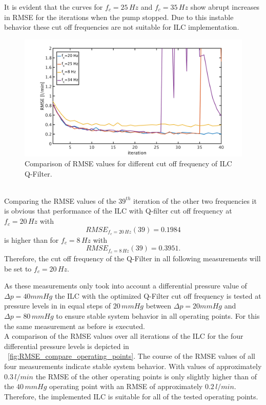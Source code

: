 It is evident that the curves for $f_c=25\,Hz$ and $f_c=35\,Hz$ show abrupt increases in RMSE for the iterations when the pump stopped. Due to this instable behavior these cut off frequencies are not suitable for ILC implementation.
\begin{figure}[ht]
  \centering
  \includegraphics[width=\textwidth]{images/chapt_5/ILC/RMSE_compare_ILC3_fc.pdf}
  \caption[Comparison of RMSE values for different cut off frequency of ILC Q-Filter]{Comparison of RMSE values for different cut off frequency of ILC Q-Filter.}
  \label{fig:RMSE_compare_ILC3_fc}
\end{figure}
\\Comparing the RMSE values of the $39^{th}$ iteration of the other two frequencies it is obvious that performance of the ILC with Q-filter cut off frequency at $f_c=20\,Hz$ with
\begin{equation}
  RMSE_{f_c=20\,Hz}(39)=0.1984
\end{equation}
is higher than for $f_c=8\,Hz$ with
\begin{equation}
  RMSE_{f_c=8\,Hz}(39)=0.3951.
\end{equation}
Therefore, the cut off frequency of the Q-Filter in all following measurements will be set to $f_c=20\,Hz$.

As these measurements only took into account a differential pressure value of $\Delta{p}=40mmHg$ the ILC with the optimized Q-Filter cut off frequency is tested at pressure levels in in equal steps of $20\,mmHg$ between $\Delta{p}=20mmHg$ and $\Delta{p}=80\,mmHg$ to ensure stable system behavior in all operating points. For this the same measurement as before is executed.
\\A comparison of the RMSE values over all iterations of the ILC for the four differential pressure levels is depicted in \figurename~\ref{fig:RMSE_compare_operating_points}. The course of the RMSE values of all four measurements indicate stable system behavior. With values of approximately $0.3\, l/min$ the RMSE of the other operating points is only slightly higher than of the $40\,mmHg$ operating point with an RMSE of approximately $0.2\,l/min$. Therefore, the implemented ILC is suitable for all of the tested operating points.

